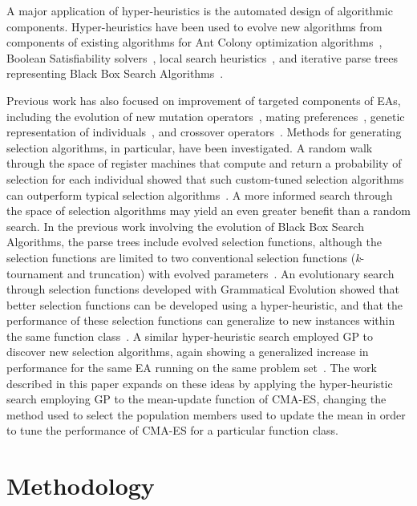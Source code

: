 \documentclass[sigconf]{acmart}
\begin{document}
A major application of hyper-heuristics is the automated design of algorithmic components. Hyper-heuristics have been used to evolve new algorithms from components of existing algorithms for Ant Colony optimization algorithms~\citep{lopez2012antcol}, Boolean Satisfiability solvers~\citep{khudabukhsh2009satenstein}, local search heuristics~\citep{burke2012localHeuristics}, and iterative parse trees representing Black Box Search Algorithms~\citep{martin2013evolvingBBSA}.

Previous work has also focused on improvement of targeted components of EAs, including the evolution of new mutation operators~\citep{woodward2012mutationGeneration, hong2013probMutation}, mating preferences~\citep{guntly2011limp}, genetic representation of individuals~\citep{scott2015geneticRepresentations}, and crossover operators~\citep{goldman2011scc}. Methods for generating selection algorithms, in particular, have been investigated. A random walk through the space of register machines that compute and return a probability of selection for each individual showed that such custom-tuned selection algorithms can outperform typical selection algorithms~\citep{woodward2011selection}. A more informed search through the space of selection algorithms may yield an even greater benefit than a random search. In the previous work involving the evolution of Black Box Search Algorithms, the parse trees include evolved selection functions, although the selection functions are limited to two conventional selection functions (\textit{k}-tournament and truncation) with evolved parameters~\citep{martin2013evolvingBBSA}. An evolutionary search through selection functions developed with Grammatical Evolution showed that better selection functions can be developed using a hyper-heuristic, and that the performance of these selection functions can generalize to new instances within the same function class~\citep{lourencco2013selection}. A similar hyper-heuristic search employed GP to discover new selection algorithms, again showing a generalized increase in performance for the same EA running on the same problem set~\citep{richter2018adpsea}. The work described in this paper expands on these ideas by applying the hyper-heuristic search employing GP to the mean-update function of CMA-ES, changing the method used to select the population members used to update the mean in order to tune the performance of CMA-ES for a particular function class.
 

\section{Methodology}
\label{Methodology}
\end{document}

